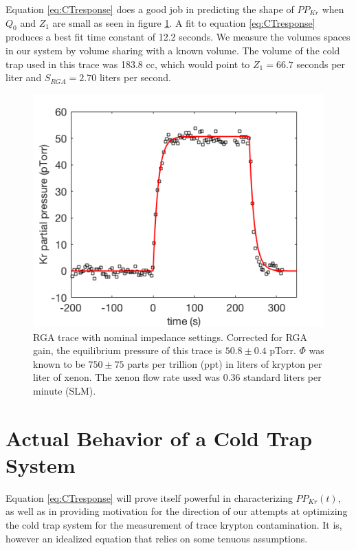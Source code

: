 \documentclass[12pt]{article}
\begin{document}
Equation \ref{eq:CTresponse} does a good job in predicting the shape of $PP_{Kr}$ when $Q_0$ and $Z_1$ are small as seen in figure \ref{fig:RGAtrace_fast}. A fit to equation \ref{eq:CTresponse} produces a best fit time constant of 12.2 seconds. We measure the volumes spaces in our system by volume sharing with a known volume. The volume of the cold trap used in this trace was 183.8 cc, which would point to $Z_1=66.7$ seconds per liter and $S_{RGA}=2.70$ liters per second. 
\begin{figure}[h!]
\centering
\includegraphics[width=\textwidth]{Figures/RGATrace_fit_fast.png}
\caption{RGA trace with nominal impedance settings. Corrected for RGA gain, the equilibrium pressure of this trace is $50.8 \pm 0.4$ pTorr. $\Phi$ was known to be $750 \pm 75$ parts per trillion (ppt) in liters of krypton per liter of xenon. The xenon flow rate used was 0.36 standard liters per minute (SLM). }
\label{fig:RGAtrace_fast}
\end{figure}





\section{Actual Behavior of a Cold Trap System}
Equation \ref{eq:CTresponse} will prove itself powerful in characterizing $PP_{Kr}(t)$, as well as in providing motivation for the direction of our attempts at optimizing the cold trap system for the measurement of trace krypton contamination. It is, however an idealized equation that relies on some tenuous assumptions. 
\end{document}
